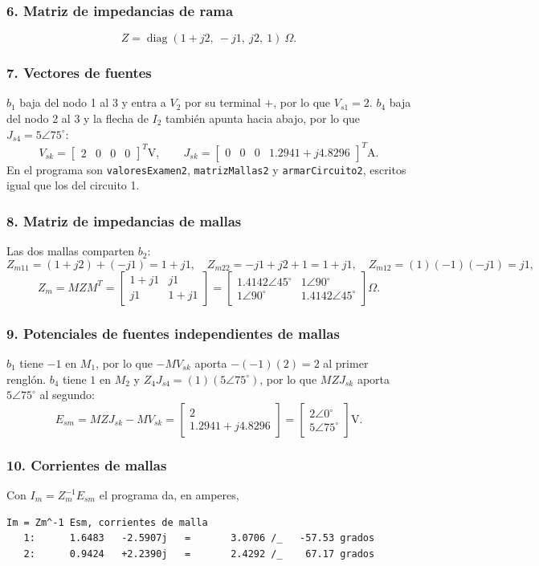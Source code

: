 \documentclass[12pt, letterpaper]{article}
\newcommand{\pol}[2]{#1\angle {#2}^{\circ}}
\newcommand{\paso}[1]{\subsubsection*{#1}}
\begin{document}
\paso{6. Matriz de impedancias de rama}

\[
Z = \operatorname{diag}\left(1 + j2,\ -j1,\ j2,\ 1\right)\ \Omega .
\]

\paso{7. Vectores de fuentes}

$b_1$ baja del nodo 1 al 3 y entra a $V_2$ por su terminal $+$, por lo que $V_{s1} = 2$. $b_4$ baja del nodo 2 al 3
y la flecha de $I_2$ también apunta hacia abajo, por lo que $J_{s4} = \pol{5}{75}$:
\[
V_{sk} = \begin{bmatrix} 2 & 0 & 0 & 0 \end{bmatrix}^T \text{V}, \qquad
J_{sk} = \begin{bmatrix} 0 & 0 & 0 & 1.2941 + j4.8296 \end{bmatrix}^T \text{A}.
\]
En el programa son \texttt{valoresExamen2}, \texttt{matrizMallas2} y \texttt{armarCircuito2}, escritos igual que
los del circuito 1.

\paso{8. Matriz de impedancias de mallas}

Las dos mallas comparten $b_2$:
\[
Z_{m11} = (1 + j2) + (-j1) = 1 + j1, \quad
Z_{m22} = -j1 + j2 + 1 = 1 + j1, \quad
Z_{m12} = (1)(-1)(-j1) = j1,
\]
\[
Z_m = M Z M^T = \begin{bmatrix} 1 + j1 & j1 \\ j1 & 1 + j1 \end{bmatrix}
= \begin{bmatrix} \pol{1.4142}{45} & \pol{1}{90} \\ \pol{1}{90} & \pol{1.4142}{45} \end{bmatrix} \Omega .
\]

\paso{9. Potenciales de fuentes independientes de mallas}

$b_1$ tiene $-1$ en $M_1$, por lo que $-M V_{sk}$ aporta $-(-1)(2) = 2$ al primer renglón. $b_4$ tiene $1$ en $M_2$
y $Z_4 J_{s4} = (1)(\pol{5}{75})$, por lo que $M Z J_{sk}$ aporta $\pol{5}{75}$ al segundo:
\[
E_{sm} = M Z J_{sk} - M V_{sk} =
\begin{bmatrix} 2 \\ 1.2941 + j4.8296 \end{bmatrix} =
\begin{bmatrix} \pol{2}{0} \\ \pol{5}{75} \end{bmatrix} \text{V}.
\]

\paso{10. Corrientes de mallas}

Con $I_m = Z_m^{-1} E_{sm}$ el programa da, en amperes,
\begin{lstlisting}[style=salida]
Im = Zm^-1 Esm, corrientes de malla
   1:      1.6483   -2.5907j   =       3.0706 /_   -57.53 grados
   2:      0.9424   +2.2390j   =       2.4292 /_    67.17 grados
\end{lstlisting}
\end{document}
